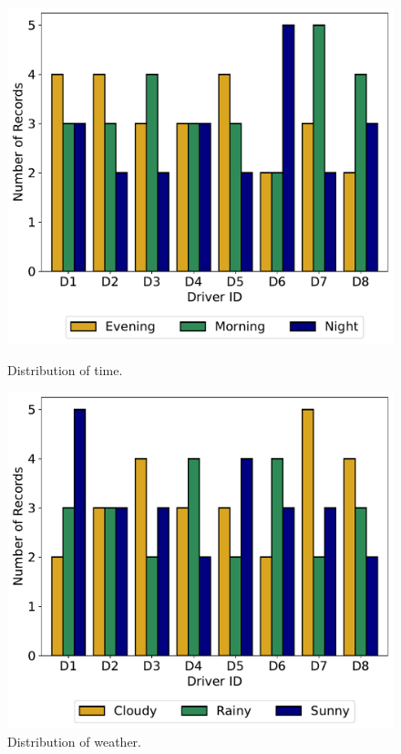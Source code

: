 \begin{figure}[h]
    \centering
    \begin{minipage}{0.5\textwidth}
        \centering
        \includegraphics[width=\textwidth]{images/dreyeve/time_distrib.pdf}
        \caption{Distribution of time.}
        \label{fig:plot1}
    \end{minipage}\hfill
    \begin{minipage}{0.5\textwidth}
        \centering
        \includegraphics[width=\textwidth]{images/dreyeve/weather_distrib.pdf}
        \caption{Distribution of weather.}
        \label{fig:plot2}
    \end{minipage}\hfill
\end{figure}
